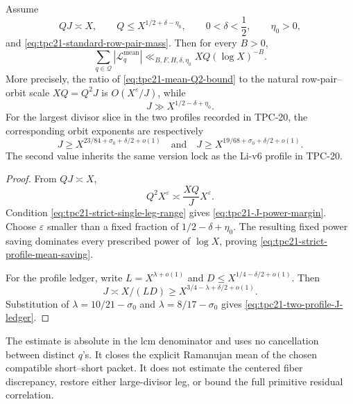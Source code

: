 \begin{corollary}
\label{cor:tpc21-strict-profile-mean-saving}
Assume
\begin{equation}
 QJ\asymp X,
 \qquad
 Q\le X^{1/2+\delta-\eta_0},
 \qquad 0<\delta<\frac12,\qquad \eta_0>0,
 \label{eq:tpc21-strict-single-leg-range}
\end{equation}
and \eqref{eq:tpc21-standard-row-pair-mass}.  Then for every
\(B>0\),
\begin{equation}
 \boxed{
 \sum_{q\in\mathcal Q}|\mathcal L_q^{\mathrm{mean}}|
 \ll_{B,F,H,\delta,\eta_0}
 XQ(\log X)^{-B}.}
 \label{eq:tpc21-strict-profile-mean-saving}
\end{equation}
More precisely, the ratio of
\eqref{eq:tpc21-mean-Q2-bound} to the natural row-pair--orbit scale
\(XQ=Q^2J\) is \(O(X^\varepsilon/J)\), while
\begin{equation}
 J\gg X^{1/2-\delta+\eta_0}.
 \label{eq:tpc21-J-power-margin}
\end{equation}
For the largest divisor slice in the two profiles recorded in TPC-20,
the corresponding orbit exponents are respectively
\begin{equation}
 J\ge X^{23/84+\sigma_0+\delta/2+o(1)}
 \quad\text{and}\quad
 J\ge X^{19/68+\sigma_0+\delta/2+o(1)}.
 \label{eq:tpc21-two-profile-J-ledger}
\end{equation}
The second value inherits the same version lock as the Li-v6 profile
in TPC-20.
\end{corollary}

\begin{proof}
From \(QJ\asymp X\),
\[
 Q^2X^\varepsilon
 \asymp \frac{XQ}{J}X^\varepsilon.
\]
Condition \eqref{eq:tpc21-strict-single-leg-range} gives
\eqref{eq:tpc21-J-power-margin}.  Choose \(\varepsilon\) smaller than
a fixed fraction of \(1/2-\delta+\eta_0\).  The resulting fixed power
saving dominates every prescribed power of \(\log X\), proving
\eqref{eq:tpc21-strict-profile-mean-saving}.

For the profile ledger, write
\(L=X^{\lambda+o(1)}\) and
\(D\le X^{1/4-\delta/2+o(1)}\).  Then
\[
 J\asymp X/(LD)
 \ge X^{3/4-\lambda+\delta/2+o(1)}.
\]
Substitution of \(\lambda=10/21-\sigma_0\) and
\(\lambda=8/17-\sigma_0\) gives
\eqref{eq:tpc21-two-profile-J-ledger}.
\end{proof}

\begin{remark}
\label{rem:tpc21-mean-closure-scope}
The estimate is absolute in the lcm denominator and uses no
cancellation between distinct \(q\)'s.  It closes the explicit
Ramanujan mean of the chosen compatible short--short packet.  It does
not estimate the centered fiber discrepancy, restore either
large-divisor leg, or bound the full primitive residual correlation.
\end{remark}
